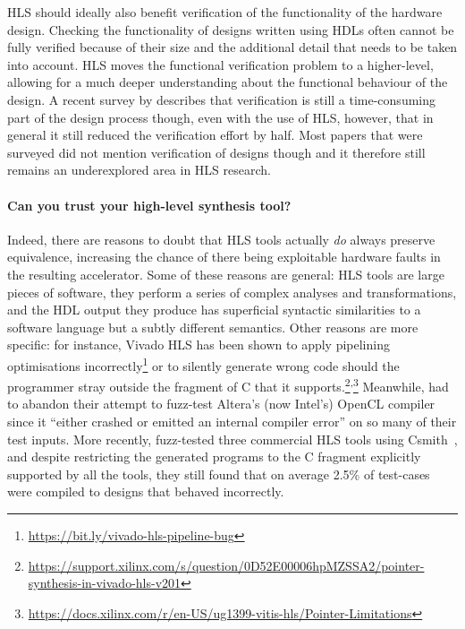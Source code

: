 \gls{HLS} should ideally also benefit verification of the functionality of the
hardware design.  Checking the functionality of designs written using
\glspl{HDL} often cannot be fully verified because of their size and the
additional detail that needs to be taken into account.  \gls{HLS} moves the
functional verification problem to a higher-level, allowing for a much deeper
understanding about the functional behaviour of the design.  A recent survey by
\textcite{lahti19_are_we_there_yet} describes that verification is still a
time-consuming part of the design process though, even with the use of
\gls{HLS}, however, that in general it still reduced the verification effort by
half.  Most papers that were surveyed did not mention verification of designs
though and it therefore still remains an underexplored area in \gls{HLS}
research.


\paragraph{Can you trust your high-level synthesis tool?}

Indeed, there are reasons to doubt that \gls{HLS} tools actually \emph{do}
always preserve equivalence, increasing the chance of there being exploitable
hardware faults in the resulting accelerator.  Some of these reasons are
general: \gls{HLS} tools are large pieces of software, they perform a series of
complex analyses and transformations, and the \gls{HDL} output they produce has
superficial syntactic similarities to a software language but a subtly different
semantics.  Other reasons are more specific: for instance, Vivado HLS has been
shown to apply pipelining optimisations
incorrectly\footnote{\url{https://bit.ly/vivado-hls-pipeline-bug}} or to silently generate wrong code should the programmer
stray outside the fragment of C that it
supports.\footnote{\url{https://support.xilinx.com/s/question/0D52E00006hpMZSSA2/pointer-synthesis-in-vivado-hls-v201}}\textsuperscript{,}\footnote{\url{https://docs.xilinx.com/r/en-US/ug1399-vitis-hls/Pointer-Limitations}}
Meanwhile, \textcite{lidbury15_many_core_compil_fuzzin} had to abandon their
attempt to fuzz-test Altera's (now Intel's) OpenCL compiler since it
\enquote{either crashed or emitted an internal compiler error} on so many of
their test inputs.  More recently,
\textcite{herklotz21_empir_study_reliab_high_level_synth_tools} fuzz-tested
three commercial \gls{HLS} tools using
Csmith~\cite{yang11_findin_under_bugs_c_compil}, and despite restricting the
generated programs to the C fragment explicitly supported by all the tools, they
still found that on average 2.5\% of test-cases were compiled to designs that
behaved incorrectly.


